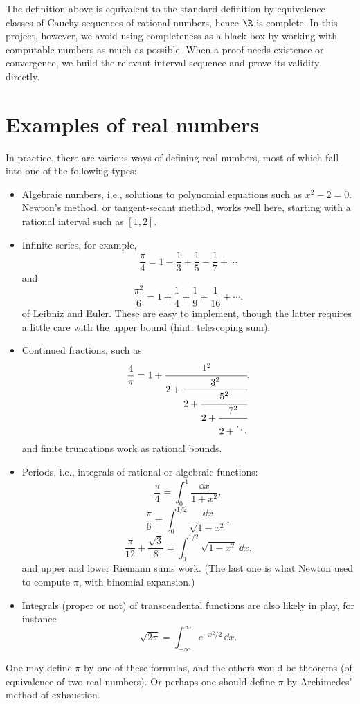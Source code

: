 \begin{remark}[Completeness]\label{rem:real-completeness}
The definition above is equivalent to the standard definition by equivalence
classes of Cauchy sequences of rational numbers, hence \(\R\) is complete.
In this project, however, we avoid using completeness as a black box by
working with computable numbers as much as possible.  When a proof needs
existence or convergence, we build the relevant interval sequence and prove
its validity directly.
\end{remark}

\section{Examples of real numbers \humanchecked}

\begin{remark}\label{rem:sources-of-raw-reals}
In practice, there are various ways of defining real numbers, most of which
fall into one of the following types:
\begin{itemize}
  \item Algebraic numbers, i.e., solutions to polynomial equations such as
  \(x^2-2=0\).  Newton's method, or tangent-secant method, works well here, starting with a rational
  interval such as \([1,2]\).

  \item Infinite series, for example,
  \[
    \frac{\pi}{4}
    =
    1-\frac{1}{3}+\frac{1}{5}-\frac{1}{7}+\cdots
  \]
  and
  \[
    \frac{\pi^2}{6}
    =
    1+\frac{1}{4}+\frac{1}{9}+\frac{1}{16}+\cdots .
  \]
  of Leibniz and Euler. These are easy to implement, though the latter requires a little
  care with the upper bound (hint: telescoping sum).

  \item Continued fractions, such as
  \[
    \frac{4}{\pi}
    =
    1+\cfrac{1^2}{2+\cfrac{3^2}{2+\cfrac{5^2}{2+\cfrac{7^2}{2+\ddots}}}}.
  \]
  and finite truncations work as rational bounds.

  \item Periods, i.e., integrals of rational or algebraic functions:
  \[
    \frac{\pi}{4}
    =
    \int_0^1\frac{\dd x}{1+x^2},
  \]
  \[
    \frac{\pi}{6}
    =
    \int_0^{1/2}\frac{\dd x}{\sqrt{1-x^2}},
  \]
  \[
    \frac{\pi}{12}+\frac{\sqrt3}{8}
    =
    \int_0^{1/2}\sqrt{1-x^2}\,\dd x.
  \]
  and upper and lower Riemann sums work. (The last one is what Newton used to compute \(\pi\),
  with binomial expansion.)

  \item Integrals (proper or not) of transcendental functions are also
  likely in play, for instance
  \[
    \sqrt{2\pi}
    =
    \int_{-\infty}^{\infty} e^{-x^2/2}\,\dd x.
  \]
\end{itemize}

One may define \(\pi\) by one of these formulas, and the others would be
theorems (of equivalence of two real numbers). Or perhaps one should
define \(\pi\) by Archimedes' method of exhaustion.
\end{remark}

